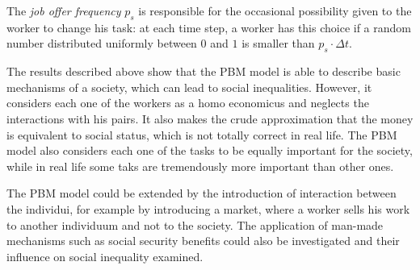 The \emph{job offer frequency} $p_s$ is responsible for the occasional possibility given to the worker to change his task: at each time step, a worker has this choice if a random number distributed uniformly between $0$ and $1$ is smaller than $p_s \cdot \Delta t$.

The results described above show that the PBM model is able to describe basic mechanisms of a society, which can lead to social inequalities. However, it considers each one of the workers as a homo economicus and neglects the interactions with his pairs. It also makes the crude approximation that the money is equivalent to social status, which is not totally correct in real life. 
The PBM model also considers each one of the tasks to be equally important for the society, while in real life some taks are tremendously more important than other ones.

The PBM model could be extended by the introduction of interaction between the individui, for example by introducing a market, where a worker sells his work to another individuum and not to the society. The application of man-made mechanisms such as social security benefits could also be investigated and their influence on social inequality examined.
